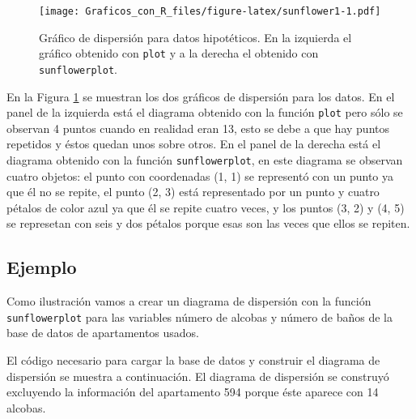 \documentclass[10pt,]{krantz}
\makeatletter
\newenvironment{Shaded}{\begin{snugshade}}{\end{snugshade}}
\newcommand{\KeywordTok}[1]{\textcolor[rgb]{0.13,0.29,0.53}{\textbf{#1}}}
\newcommand{\DataTypeTok}[1]{\textcolor[rgb]{0.13,0.29,0.53}{#1}}
\newcommand{\DecValTok}[1]{\textcolor[rgb]{0.00,0.00,0.81}{#1}}
\newcommand{\StringTok}[1]{\textcolor[rgb]{0.31,0.60,0.02}{#1}}
\newcommand{\CommentTok}[1]{\textcolor[rgb]{0.56,0.35,0.01}{\textit{#1}}}
\newcommand{\OperatorTok}[1]{\textcolor[rgb]{0.81,0.36,0.00}{\textbf{#1}}}
\newcommand{\NormalTok}[1]{#1}
\newenvironment{kframe}{%
\medskip{}
\setlength{\fboxsep}{.8em}
 \def\at@end@of@kframe{}%
 \ifinner\ifhmode%
  \def\at@end@of@kframe{\end{minipage}}%
  \begin{minipage}{\columnwidth}%
 \fi\fi%
 \def\FrameCommand##1{\hskip\@totalleftmargin \hskip-\fboxsep
 \colorbox{shadecolor}{##1}\hskip-\fboxsep
     \hskip-\linewidth \hskip-\@totalleftmargin \hskip\columnwidth}%
 \MakeFramed {\advance\hsize-\width
   \@totalleftmargin\z@ \linewidth\hsize
   \@setminipage}}%
 {\par\unskip\endMakeFramed%
 \at@end@of@kframe}
\renewenvironment{Shaded}{\begin{kframe}}{\end{kframe}}
\makeatother
\begin{document}
\begin{figure}
\centering
\texttt{[image: Graficos\_con\_R\_files/figure-latex/sunflower1-1.pdf]}
\caption{\label{fig:sunflower1}Gráfico de dispersión para datos hipotéticos.
En la izquierda el gráfico obtenido con \texttt{plot} y a la derecha el
obtenido con \texttt{sunflowerplot}.}
\end{figure}

En la Figura \ref{fig:sunflower1} se muestran los dos gráficos de
dispersión para los datos. En el panel de la izquierda está el diagrama
obtenido con la función \texttt{plot} pero sólo se observan 4 puntos
cuando en realidad eran 13, esto se debe a que hay puntos repetidos y
éstos quedan unos sobre otros. En el panel de la derecha está el
diagrama obtenido con la función \texttt{sunflowerplot}, en este
diagrama se observan cuatro objetos: el punto con coordenadas (1, 1) se
representó con un punto ya que él no se repite, el punto (2, 3) está
representado por un punto y cuatro pétalos de color azul ya que él se
repite cuatro veces, y los puntos (3, 2) y (4, 5) se represetan con seis
y dos pétalos porque esas son las veces que ellos se repiten.

\subsection*{Ejemplo}\label{ejemplo-12}


Como ilustración vamos a crear un diagrama de dispersión con la función
\texttt{sunflowerplot} para las variables número de alcobas y número de
baños de la base de datos de apartamentos usados.

El código necesario para cargar la base de datos y construir el diagrama
de dispersión se muestra a continuación. El diagrama de dispersión se
construyó excluyendo la información del apartamento 594 porque éste
aparece con 14 alcobas.

\begin{Shaded}
\end{Shaded}
\end{document}

